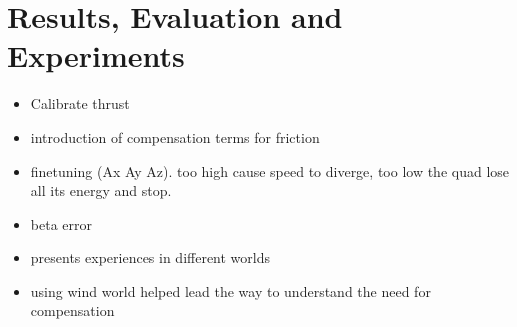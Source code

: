 \section{Results, Evaluation and Experiments}
 \begin{itemize}
    \item Calibrate thrust
    \item  introduction of compensation terms for friction
    \item finetuning (Ax Ay Az). too high cause speed to diverge, too low the quad lose all its energy and stop. 
    \item beta error
    \item presents experiences in different worlds
    \item using wind world helped lead the way to understand the need for compensation
 \end{itemize}
